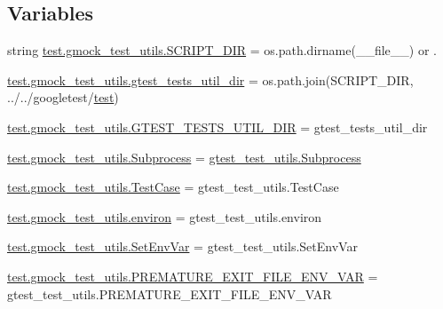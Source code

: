 \subsection*{Variables}
\begin{DoxyCompactItemize}
\item 
string \mbox{\hyperlink{namespacetest_1_1gmock__test__utils_acd989690af295e96f085e0495b7d534a}{test.\+gmock\+\_\+test\+\_\+utils.\+S\+C\+R\+I\+P\+T\+\_\+\+D\+IR}} = os.\+path.\+dirname(\+\_\+\+\_\+file\+\_\+\+\_\+) or \textquotesingle{}.\textquotesingle{}
\item 
\mbox{\hyperlink{namespacetest_1_1gmock__test__utils_ab9f899d331de99dc5ce7000301189a8d}{test.\+gmock\+\_\+test\+\_\+utils.\+gtest\+\_\+tests\+\_\+util\+\_\+dir}} = os.\+path.\+join(S\+C\+R\+I\+P\+T\+\_\+\+D\+IR, \textquotesingle{}../../googletest/\mbox{\hyperlink{_mutual_8h_a707ee03719e99670bf6cfdfd897b8456}{test}}\textquotesingle{})
\item 
\mbox{\hyperlink{namespacetest_1_1gmock__test__utils_a4af656b46dfb5a02a61293b7b671b4ce}{test.\+gmock\+\_\+test\+\_\+utils.\+G\+T\+E\+S\+T\+\_\+\+T\+E\+S\+T\+S\+\_\+\+U\+T\+I\+L\+\_\+\+D\+IR}} = gtest\+\_\+tests\+\_\+util\+\_\+dir
\item 
\mbox{\hyperlink{namespacetest_1_1gmock__test__utils_ada86bbfe3546e4e5385e6853f02bfb0a}{test.\+gmock\+\_\+test\+\_\+utils.\+Subprocess}} = \mbox{\hyperlink{classgtest__test__utils_1_1_subprocess}{gtest\+\_\+test\+\_\+utils.\+Subprocess}}
\item 
\mbox{\hyperlink{namespacetest_1_1gmock__test__utils_a214cc134d9549508e3d4cebdd7de0741}{test.\+gmock\+\_\+test\+\_\+utils.\+Test\+Case}} = gtest\+\_\+test\+\_\+utils.\+Test\+Case
\item 
\mbox{\hyperlink{namespacetest_1_1gmock__test__utils_a043a2edfb6718610cf223c9e806a2e29}{test.\+gmock\+\_\+test\+\_\+utils.\+environ}} = gtest\+\_\+test\+\_\+utils.\+environ
\item 
\mbox{\hyperlink{namespacetest_1_1gmock__test__utils_a312cebe51380cf393a9797f650dd853d}{test.\+gmock\+\_\+test\+\_\+utils.\+Set\+Env\+Var}} = gtest\+\_\+test\+\_\+utils.\+Set\+Env\+Var
\item 
\mbox{\hyperlink{namespacetest_1_1gmock__test__utils_ac1f6d47df21860ecaacdd24cc4bee801}{test.\+gmock\+\_\+test\+\_\+utils.\+P\+R\+E\+M\+A\+T\+U\+R\+E\+\_\+\+E\+X\+I\+T\+\_\+\+F\+I\+L\+E\+\_\+\+E\+N\+V\+\_\+\+V\+AR}} = gtest\+\_\+test\+\_\+utils.\+P\+R\+E\+M\+A\+T\+U\+R\+E\+\_\+\+E\+X\+I\+T\+\_\+\+F\+I\+L\+E\+\_\+\+E\+N\+V\+\_\+\+V\+AR
\end{DoxyCompactItemize}
